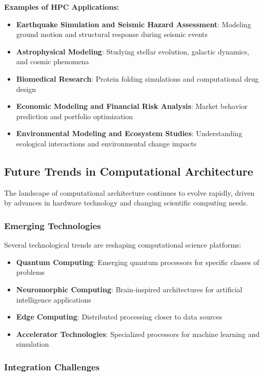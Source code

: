 \textbf{Examples of HPC Applications:}
\begin{itemize}
    \item \textbf{Earthquake Simulation and Seismic Hazard Assessment}: Modeling ground motion and structural response during seismic events
    \item \textbf{Astrophysical Modeling}: Studying stellar evolution, galactic dynamics, and cosmic phenomena
    \item \textbf{Biomedical Research}: Protein folding simulations and computational drug design
    \item \textbf{Economic Modeling and Financial Risk Analysis}: Market behavior prediction and portfolio optimization
    \item \textbf{Environmental Modeling and Ecosystem Studies}: Understanding ecological interactions and environmental change impacts
\end{itemize}

\subsection{Future Trends in Computational Architecture}

The landscape of computational architecture continues to evolve rapidly, driven by advances in hardware technology and changing scientific computing needs.

\subsubsection{Emerging Technologies}

Several technological trends are reshaping computational science platforms:

\begin{itemize}
    \item \textbf{Quantum Computing}: Emerging quantum processors for specific classes of problems
    \item \textbf{Neuromorphic Computing}: Brain-inspired architectures for artificial intelligence applications
    \item \textbf{Edge Computing}: Distributed processing closer to data sources
    \item \textbf{Accelerator Technologies}: Specialized processors for machine learning and simulation
\end{itemize}

\subsubsection{Integration Challenges}

